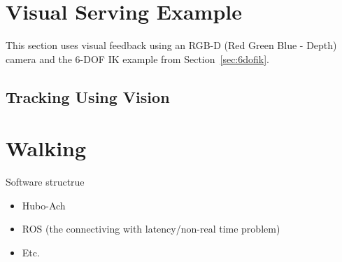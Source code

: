 \section{Visual Serving Example}
This section uses visual feedback using an RGB-D (Red Green Blue - Depth) camera and the 6-DOF IK example from Section~\ref{sec:6dofik}.
	\subsection{Tracking Using Vision}
		
		



\section{Walking}
	









Software structrue
\begin{itemize}
\item Hubo-Ach
\item ROS (the connectiving with latency/non-real time problem)

\item Etc.
\end{itemize}







